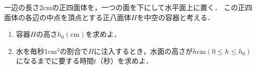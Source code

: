 \documentclass[../../main.tex]{subfiles}
\begin{document}
一辺の長さ$2\mathrm{cm}$の正四面体を，一つの面を下にして水平面上に置く．
この正四面体の各辺の中点を頂点とする正八面体$H$を中空の容器と考える．
\begin{enumerate}
  \item 容器$H$の高さ$h_0(\mathrm{cm})$を求めよ．
  \item 水を毎秒$1\mathrm{cm}^3$の割合で$H$に注入するとき，水面の高さが$h \mathrm{cm} (0\le h\le h_0)$になるまでに要する時間$t$（秒）を求めよ．
\end{enumerate}
\end{document}
